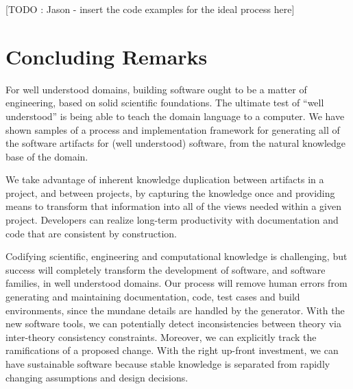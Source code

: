 \documentclass[sigconf,review]{acmart}
\begin{document}
[TODO : Jason - insert the code examples for the ideal process here]

\section{Concluding Remarks} \label{ch:concluding_remarks}

For well understood domains, building software ought to be a matter of
engineering, based on solid scientific foundations. The ultimate test of ``well
understood'' is being able to teach the domain language to a computer. We have
shown samples of a process and implementation framework for generating all of
the software artifacts for (well understood) software, from the natural
knowledge base of the domain.

We take advantage of inherent knowledge duplication between artifacts in a
project, and between projects, by capturing the knowledge once and providing
means to transform that information into all of the views needed within a given
project.  Developers can realize long-term productivity with documentation and
code that are consistent by construction.

Codifying scientific, engineering and computational knowledge is challenging,
but success will completely transform the development of software, and software
families, in well understood domains. Our process will remove human errors from
generating and maintaining documentation, code, test cases and build
environments, since the mundane details are handled by the generator.  With the
new software tools, we can potentially detect inconsistencies between theory via
inter-theory consistency constraints. Moreover, we can explicitly track the
ramifications of a proposed change.  With the right up-front investment, we can
have sustainable software because stable knowledge is separated from rapidly
changing assumptions and design decisions.



\end{document}

